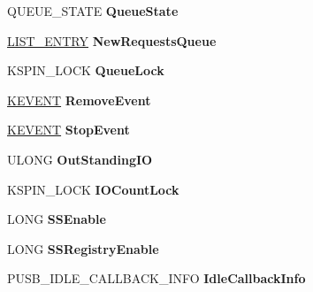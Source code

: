 \begin{DoxyCompactItemize}
Q\+U\+E\+U\+E\+\_\+\+S\+T\+A\+TE {\bfseries Queue\+State}
\item 
\mbox{\label{struct___d_e_v_i_c_e___e_x_t_e_n_s_i_o_n_a3bf4b6a294dccadf78b10a89e343a1bf}} 
\hyperlink{struct___l_i_s_t___e_n_t_r_y}{L\+I\+S\+T\+\_\+\+E\+N\+T\+RY} {\bfseries New\+Requests\+Queue}
\item 
\mbox{\label{struct___d_e_v_i_c_e___e_x_t_e_n_s_i_o_n_acc3277811ead48ba5bce497309d21626}} 
K\+S\+P\+I\+N\+\_\+\+L\+O\+CK {\bfseries Queue\+Lock}
\item 
\mbox{\label{struct___d_e_v_i_c_e___e_x_t_e_n_s_i_o_n_a4e940d518ca6b95ea41bb3e0632d2f83}} 
\hyperlink{struct___k_e_v_e_n_t}{K\+E\+V\+E\+NT} {\bfseries Remove\+Event}
\item 
\mbox{\label{struct___d_e_v_i_c_e___e_x_t_e_n_s_i_o_n_ad5eac3c01f6eac8b7043dd62fea2cab0}} 
\hyperlink{struct___k_e_v_e_n_t}{K\+E\+V\+E\+NT} {\bfseries Stop\+Event}
\item 
\mbox{\label{struct___d_e_v_i_c_e___e_x_t_e_n_s_i_o_n_aa019b37d998f417d017d4be8920b9b0d}} 
U\+L\+O\+NG {\bfseries Out\+Standing\+IO}
\item 
\mbox{\label{struct___d_e_v_i_c_e___e_x_t_e_n_s_i_o_n_a6b431a30330667719cac8eacca81f00c}} 
K\+S\+P\+I\+N\+\_\+\+L\+O\+CK {\bfseries I\+O\+Count\+Lock}
\item 
\mbox{\label{struct___d_e_v_i_c_e___e_x_t_e_n_s_i_o_n_ade2bf00bc12667f63a405314287fe2eb}} 
L\+O\+NG {\bfseries S\+S\+Enable}
\item 
\mbox{\label{struct___d_e_v_i_c_e___e_x_t_e_n_s_i_o_n_acc6bd5bcd54f4b66cbe4bb1351c8b72f}} 
L\+O\+NG {\bfseries S\+S\+Registry\+Enable}
\item 
\mbox{\label{struct___d_e_v_i_c_e___e_x_t_e_n_s_i_o_n_ab4afca1e8d825fefe877d3c204627be4}} 
P\+U\+S\+B\+\_\+\+I\+D\+L\+E\+\_\+\+C\+A\+L\+L\+B\+A\+C\+K\+\_\+\+I\+N\+FO {\bfseries Idle\+Callback\+Info}

\end{DoxyCompactItemize}

